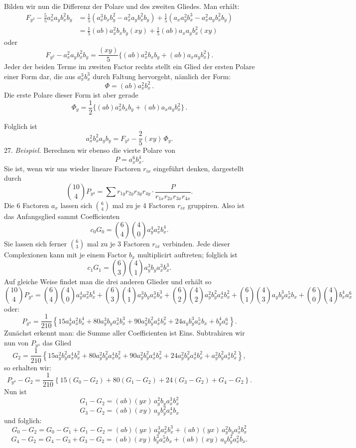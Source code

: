 \documentclass[11pt]{article}
\providecommand{\weberpage}[1]{}
\let\Phi\varPhi
\begin{document}
Bilden wir nun die Differenz der Polare und des zweiten Gliedes. Man erhält:
\[
\begin{aligned}
F_{y^2}-\frac{5}{5}a_x^2a_yb_x^2b_y &=\frac{1}{5}(a_x^3b_xb_y^2-a_x^2a_yb_x^2b_y)+\frac{1}{5}(a_xa_y^2b_x^3-a_x^2a_yb_x^2b_y)\\
&=\frac{1}{5}(ab)a_x^2b_xb_y(xy)+\frac{1}{5}(ab)a_xa_yb_x^2(xy)
\end{aligned}
\]
oder
\[
F_{y^2}-a_x^2a_yb_x^2b_y=\frac{(xy)}{5}\Big\{(ab)a_x^2b_xb_y+(ab)a_xa_yb_x^2\Big\}\,.
\]
Jeder der beiden Terme im zweiten Factor rechts stellt ein Glied der ersten Polare einer Form dar, die aus $a_x^3b_x^3$ durch Faltung hervorgeht, nämlich der Form:
\[
\Phi=(ab)a_x^2b_x^2\,.
\]
Die erste Polare dieser Form ist aber gerade
\[
\Phi_y=\frac{1}{2}\Big\{(ab)a_x^2b_xb_y+(ab)a_xa_yb_x^2\Big\}\,.
\]


\weberpage{29}
Folglich ist
\[
a_x^2 b_x^2 a_y b_y = F_{y^2} - \frac{2}{5} (xy)\, \Phi_y .
\]
27. \textit{Beispiel.} Berechnen wir ebenso die vierte Polare von
\[
P = a_x^6 b_x^4 .
\]
Sie ist, wenn wir uns wieder lineare Factoren $r_{ix}$ eingeführt denken, dargestellt durch
\[
\binom{10}{4} P_{y^4} = \sum r_{1y} r_{2y} r_{3y} r_{4y} \cdot \frac{P}{r_{1x} r_{2x} r_{3x} r_{4x}} .
\]
Die 6 Factoren $a_x$ lassen sich $\binom{6}{4}$ mal zu je 4 Factoren $r_{ix}$ gruppiren.
Also ist das Anfangsglied sammt Coefficienten
\[
c_0 G_0 = \binom{6}{4} \binom{4}{0} a_y^4 a_x^2 b_x^4 .
\]
Sie lassen sich ferner $\binom{6}{3}$ mal zu je 3 Factoren $r_{ix}$ verbinden. Jede dieser Complexionen kann mit je einem Factor $b_x$ multiplicirt auftreten; folglich ist
\[
c_1 G_1 = \binom{6}{3} \binom{4}{1} a_y^3 b_y a_x^3 b_x^3 .
\]
Auf gleiche Weise findet man die drei anderen Glieder und erhält so
\[
\binom{10}{4} P_{y^4} = \binom{6}{4} \binom{4}{0} a_y^4 a_x^2 b_x^4 + \binom{6}{3} \binom{4}{1} a_y^3 b_y a_x^3 b_x^3 + \binom{6}{2} \binom{4}{2} a_y^2 b_y^2 a_x^4 b_x^2 + \binom{6}{1} \binom{4}{3} a_y b_y^3 a_x^5 b_x + \binom{6}{0} \binom{4}{4} b_x^4 a_x^6
\]
oder:
\[
P_{y^4} = \frac{1}{210} \left\{ 15 a_y^4 a_x^2 b_x^4 + 80 a_y^3 b_y a_x^3 b_x^3 + 90 a_y^2 b_y^2 a_x^4 b_x^2 + 24 a_y b_y^3 a_x^5 b_x + b_y^4 a_x^6 \right\} .
\]
Zunächst erkennt man: die Summe aller Coefficienten ist Eins. Subtrahiren wir nun von $P_{y^4}$ das Glied
\[
G_2 = \frac{1}{210} \left\{ 15 a_y^2 b_y^2 a_x^4 b_x^2 + 80 a_y^2 b_y^2 a_x^4 b_x^2 + 90 a_y^2 b_y^2 a_x^4 b_x^2 + 24 a_y^2 b_y^2 a_x^4 b_x^2 + a_y^2 b_y^2 a_x^4 b_x^2 \right\} ,
\]
so erhalten wir:
\[
P_{y^4} - G_2 = \frac{1}{210} \left\{ 15 (G_0 - G_2) + 80 (G_1 - G_2) + 24 (G_3 - G_2) + G_4 - G_2 \right\} .
\]
Nun ist
\[
G_1 - G_2 = (ab)(yx)\, a_y^2 b_y a_x^3 b_x^2
\]
\[
G_3 - G_2 = (ab)(xy)\, a_y b_y^2 a_x^4 b_x
\]
und folglich:
\[
G_0 - G_2 = G_0 - G_1 + G_1 - G_2 = (ab)(yx)\, a_y^3 a_x^2 b_x^3 + (ab)(yx)\, a_y^2 b_y a_x^3 b_x^2
\]
\[
G_4 - G_2 = G_4 - G_3 + G_3 - G_2 = (ab)(xy)\, b_y^3 a_x^5 b_x + (ab)(xy)\, a_y b_y^2 a_x^2 b_x .
\]
\end{document}
